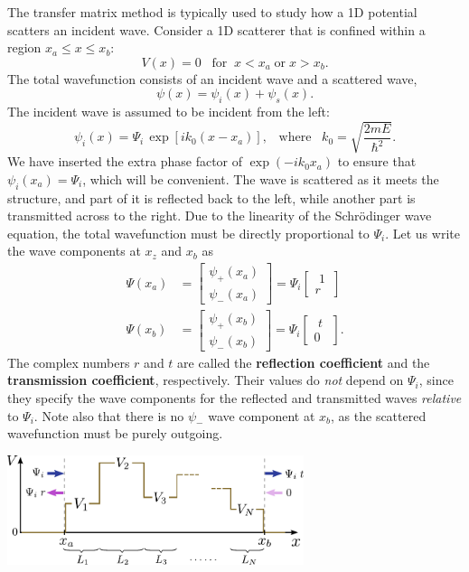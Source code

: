 \documentclass[pra,12pt]{revtex4}
\begin{document}
The transfer matrix method is typically used to study how a 1D
potential scatters an incident wave.  Consider a 1D scatterer that is
confined within a region $x_a \le x \le x_b$:
$$V(x) = 0 \;\;\;\mathrm{for}\;\;x < x_a \;\textrm{or}\; x > x_b.$$
The total wavefunction consists of an incident wave and a scattered
wave,
$$\psi(x) = \psi_i(x) + \psi_s(x).$$
The incident wave is assumed to be incident from the left:
$$\psi_i(x) = \Psi_i \, \exp[ik_0(x-x_a)], \;\;\;\textrm{where}\;\;\; k_0 = \sqrt{\frac{2mE}{\hbar^2}}.$$
We have inserted the extra phase factor of $\exp(-ik_0x_a)$ to ensure
that $\psi_i(x_a) = \Psi_i$, which will be convenient.  The wave is
scattered as it meets the structure, and part of it is reflected back
to the left, while another part is transmitted across to the right.
Due to the linearity of the Schr\"odinger wave equation, the total
wavefunction must be directly proportional to $\Psi_i$.  Let us
write the wave components at $x_z$ and $x_b$ as
$$\begin{aligned} \Psi(x_a) &= \begin{bmatrix}\psi_+(x_a) \\ \psi_-(x_a) \end{bmatrix} = \Psi_i \begin{bmatrix}\,\,1\, \\ r \end{bmatrix} \\ \Psi(x_b) &= \begin{bmatrix}\psi_+(x_b) \\ \psi_-(x_b) \end{bmatrix} = \Psi_i \begin{bmatrix}\,\,t\,\, \\ 0 \end{bmatrix}.\end{aligned}$$
The complex numbers $r$ and $t$ are called the \textbf{reflection
  coefficient} and the \textbf{transmission coefficient},
respectively.  Their values do \textit{not} depend on $\Psi_i$, since
they specify the wave components for the reflected and transmitted
waves \textit{relative} to $\Psi_i$.  Note also that there is no
$\psi_-$ wave component at $x_b$, as the scattered wavefunction
must be purely outgoing.

\begin{center}
  \includegraphics[width=0.65\textwidth]{transfer_matrix_setup3}
\end{center}
\end{document}
